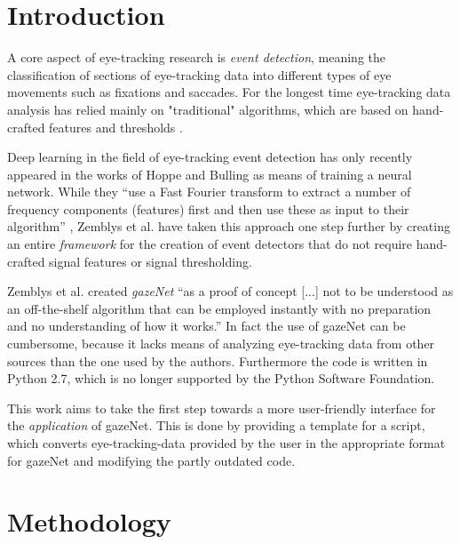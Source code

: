 \documentclass[acmlarge]{acmart}
\begin{document}
\section{Introduction}
A core aspect of eye-tracking research is \emph{event detection}, meaning the classification of sections of eye-tracking data into different types of eye movements such as fixations and saccades. For the longest time eye-tracking data analysis has relied mainly on "traditional" algorithms, which are based on hand-crafted features and thresholds \cite{zemblys2018gazeNet}.

Deep learning in the field of eye-tracking event detection has only recently appeared in the works of Hoppe and Bulling \cite{Hoppe2016EndtoEndEM} as means of training a neural network. While they ``use a Fast Fourier transform to extract a number of frequency components (features) first and then use these as input to their algorithm'' \cite{Hoppe2016EndtoEndEM}, Zemblys et al. \cite{zemblys2018gazeNet} have taken this approach one step further by creating an entire \emph{framework} for the creation of event detectors that do not require hand-crafted signal features or signal thresholding.

Zemblys et al. \cite{zemblys2018gazeNet} created \emph{gazeNet} ``as a proof of concept [...] not to be understood as an off-the-shelf algorithm that can be employed instantly with no preparation and no understanding of how it works.'' \cite{zemblys2018gazeNet} In fact the use of gazeNet can be cumbersome, because it lacks means of analyzing eye-tracking data from other sources than the one used by the authors. Furthermore the code is written in Python 2.7, which is no longer supported by the Python Software Foundation. \cite{van_Rossum_2009}

This work aims to take the first step towards a more user-friendly interface for the \emph{application} of gazeNet. This is done by providing a template for a script, which converts eye-tracking-data provided by the user in the appropriate format for gazeNet and modifying the partly outdated code.


\section{Methodology}
\end{document}
